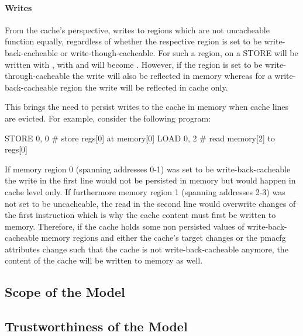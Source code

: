 \paragraph{Writes}
From the cache's perspective, writes to regions which are not uncacheable function equally, regardless of whether the respective region is set to be write-back-cacheable or write-though-cacheable.
For such a region, on a STORE  will be written with ,  with  and  will become .
However, if the region is set to be write-through-cacheable the write will also be reflected in memory whereas for a write-back-cacheable region the write will be reflected in cache only.

This brings the need to persist writes to the cache in memory when cache lines are evicted.
For example, consider the following program:
\begin{assmblr}
STORE 0, 0  # store regs[0] at memory[0]
LOAD 0, 2   # read memory[2] to regs[0]
\end{assmblr}

If memory region 0 (spanning addresses 0-1) was set to be write-back-cacheable the write in the first line would not be persisted in memory but would happen in cache level only.
If furthermore memory region 1 (spanning addresses 2-3) was not set to be uncacheable, the read in the second line would overwrite changes of the first instruction which is why the cache content must first be written to memory.
Therefore, if the cache holds some non persisted values of write-back-cacheable memory regions and either the cache's target changes or the \gls{pmacfg} attributes change such that the cache is not write-back-cacheable anymore, the content of the cache will be written to memory as well.

\subsection{Scope of the Model}
\label{sec:model-scope}

\subsection{Trustworthiness of the Model}
